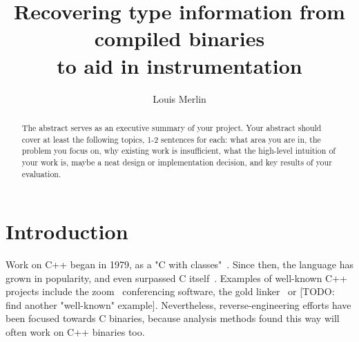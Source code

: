 \documentclass[a4paper,11pt,oneside]{report}
\title{Recovering type information from compiled binaries\\to aid in instrumentation}
\author{Louis Merlin}
\begin{document}
\maketitle
\makededication
\makeacks

\begin{abstract}
The abstract serves as an executive summary of your project.
Your abstract should cover at least the following topics, 1-2 sentences for
each: what area you are in, the problem you focus on, why existing work is
insufficient, what the high-level intuition of your work is, maybe a neat
design or implementation decision, and key results of your evaluation.
\end{abstract}


\maketoc

\chapter{Introduction}





Work on C++ began in 1979, as a "C with classes"~\cite{cwithclasses}.
Since then, the language has grown in popularity, and even surpassed C itself~\cite{stackoverflowpopularity}.
Examples of well-known C++ projects include the zoom~\cite{zoom} conferencing software, the gold linker~\cite{gold} or [TODO: find another "well-known" example].
Nevertheless, reverse-engineering efforts have been focused towards C binaries, because analysis methods found this way will often work on C++ binaries too.
\end{document}
